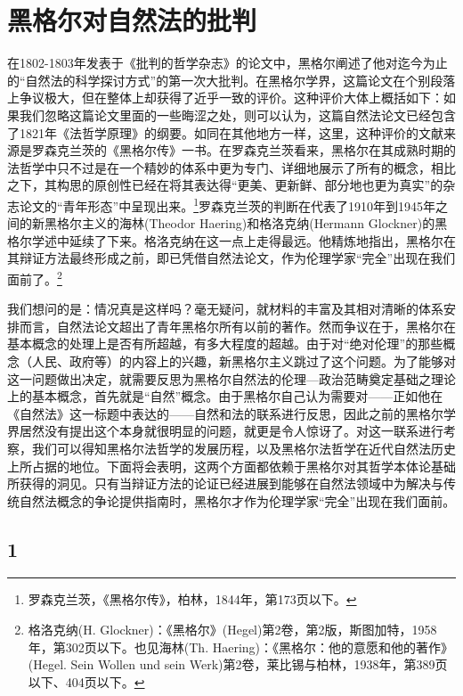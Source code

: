 \chapter{黑格尔对自然法的批判}

在1802-1803年发表于《批判的哲学杂志》的论文中，黑格尔阐述了他对迄今为止的“自然法的科学探讨方式”的第一次大批判。在黑格尔学界，这篇论文在个别段落上争议极大，但在整体上却获得了近乎一致的评价。这种评价大体上概括如下：如果我们忽略这篇论文里面的一些晦涩之处，则可以认为，这篇自然法论文已经包含了1821年《法哲学原理》的纲要。如同在其他地方一样，这里，这种评价的文献来源是罗森克兰茨的《黑格尔传》一书。在罗森克兰茨看来，黑格尔在其成熟时期的法哲学中只不过是在一个精妙的体系中更为专门、详细地展示了所有的概念，相比之下，其构思的原创性已经在将其表达得“更美、更新鲜、部分地也更为真实”的杂志论文的“青年形态”中呈现出来。\footnote{罗森克兰茨，《黑格尔传》，柏林，1844年，第173页以下。}罗森克兰茨的判断在代表了1910年到1945年之间的新黑格尔主义的海林(Theodor Haering)和格洛克纳(Hermann Glockner)的黑格尔学述中延续了下来。格洛克纳在这一点上走得最远。他精炼地指出，黑格尔在其辩证方法最终形成之前，即已凭借自然法论文，作为伦理学家“完全”出现在我们面前了。\footnote{格洛克纳(H. Glockner)：《黑格尔》(Hegel)第2卷，第2版，斯图加特，1958年，第302页以下。也见海林(Th. Haering)：《黑格尔：他的意愿和他的著作》(Hegel. Sein Wollen und sein Werk)第2卷，莱比锡与柏林，1938年，第389页以下、404页以下。}

我们想问的是：情况真是这样吗？毫无疑问，就材料的丰富及其相对清晰的体系安排而言，自然法论文超出了青年黑格尔所有以前的著作。然而争议在于，黑格尔在基本概念的处理上是否有所超越，有多大程度的超越。由于对“绝对伦理”的那些概念（人民、政府等）的内容上的兴趣，新黑格尔主义跳过了这个问题。为了能够对这一问题做出决定，就需要反思为黑格尔自然法的伦理—政治范畴奠定基础之理论上的基本概念，首先就是“自然”概念。由于黑格尔自己认为需要对——正如他在《自然法》这一标题中表达的——自然和法的联系进行反思，因此之前的黑格尔学界居然没有提出这个本身就很明显的问题，就更是令人惊讶了。对这一联系进行考察，我们可以得知黑格尔法哲学的发展历程，以及黑格尔法哲学在近代自然法历史上所占据的地位。下面将会表明，这两个方面都依赖于黑格尔对其哲学本体论基础所获得的洞见。只有当辩证方法的论证已经进展到能够在自然法领域中为解决与传统自然法概念的争论提供指南时，黑格尔才作为伦理学家“完全”出现在我们面前。

\section*{1}

